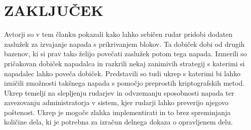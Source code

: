 \documentclass{acm_proc_article-sp}
\begin{document}
\section{ZAKLJUČEK}
Avtorji so v tem članku pokazali kako lahko sebičen rudar pridobi dodaten zaslužek za izvajanje napada s prikrivanjem blokov. Ta dobiček dobi od drugih bazenov, ki si prav tako želijo povečati zaslužek potom tega napada. Izmerili so pričakovan dobiček napadalca in razkrili nekaj zanimivih strategij s katerimi si napadalec lahko poveča dobiček. Predstavili so tudi ukrep s katerimi bi lahko izničili zmožnosti takšnega napada s pomočjo preprostih kriptografskih metod. Ukrep temelji na slepljenju rudarjev in odvzemanju sposobnosti napada ter zavezovanju administratorja v sistem, kjer rudarji lahko preverijo njegovo poštenost. Ukrep je mogoče zlahka implementirati in to brez spreminjanja količine dela, ki je potrebna za izračun delnega dokaza o opravljenem delu.
\end{document}
